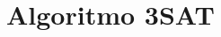 \chapter{Algoritmo 3SAT}
\label{apendice:sat}
\lstset{inputencoding=utf8/latin1}
%
\inputminted[linenos]{python}{../code-example/sat.py}
